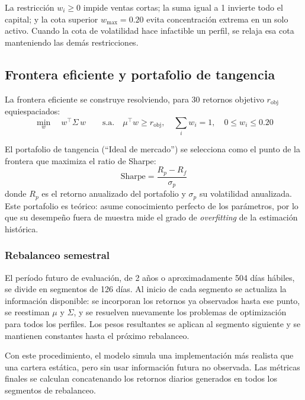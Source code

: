La restricci\'on $w_i \geq 0$ impide ventas cortas; la suma igual a 1
invierte todo el capital; y la cota superior $w_{\max} = 0.20$ evita
concentraci\'on extrema en un solo activo. Cuando la cota de volatilidad hace
infactible un perfil, se relaja esa cota manteniendo las dem\'as
restricciones.

\subsection{Frontera eficiente y portafolio de tangencia}

La frontera eficiente se construye resolviendo, para 30 retornos objetivo
$r_{\text{obj}}$ equiespaciados:
\begin{equation}
\min_{w} \quad w^\top \Sigma\, w \qquad \text{s.a.} \quad
\mu^\top w \geq r_{\text{obj}}, \quad
\sum_i w_i = 1, \quad
0 \leq w_i \leq 0.20
\end{equation}

El portafolio de tangencia (``Ideal de mercado'') se selecciona como el punto
de la frontera que maximiza el ratio de Sharpe:
\begin{equation}
\text{Sharpe} = \frac{R_p - R_f}{\sigma_p}
\end{equation}
donde $R_p$ es el retorno anualizado del portafolio y $\sigma_p$ su
volatilidad anualizada. Este portafolio es te\'orico: asume conocimiento
perfecto de los par\'ametros, por lo que su desempe\~no fuera de muestra mide
el grado de \textit{overfitting} de la estimaci\'on hist\'orica.

\subsubsection{Rebalanceo semestral}

El per\'iodo futuro de evaluaci\'on, de 2 a\~nos o aproximadamente 504 d\'ias h\'abiles, se divide en segmentos de 126 d\'ias. Al inicio de cada segmento se actualiza la informaci\'on disponible: se incorporan los retornos ya observados hasta ese punto, se reestiman $\mu$ y $\Sigma$, y se resuelven nuevamente los problemas de optimizaci\'on para todos los perfiles. Los pesos resultantes se aplican al segmento siguiente y se mantienen constantes hasta el pr\'oximo rebalanceo.

Con este procedimiento, el modelo simula una implementaci\'on m\'as realista que una cartera est\'atica, pero sin usar informaci\'on futura no observada. Las m\'etricas finales se calculan concatenando los retornos diarios generados en todos los segmentos de rebalanceo.


